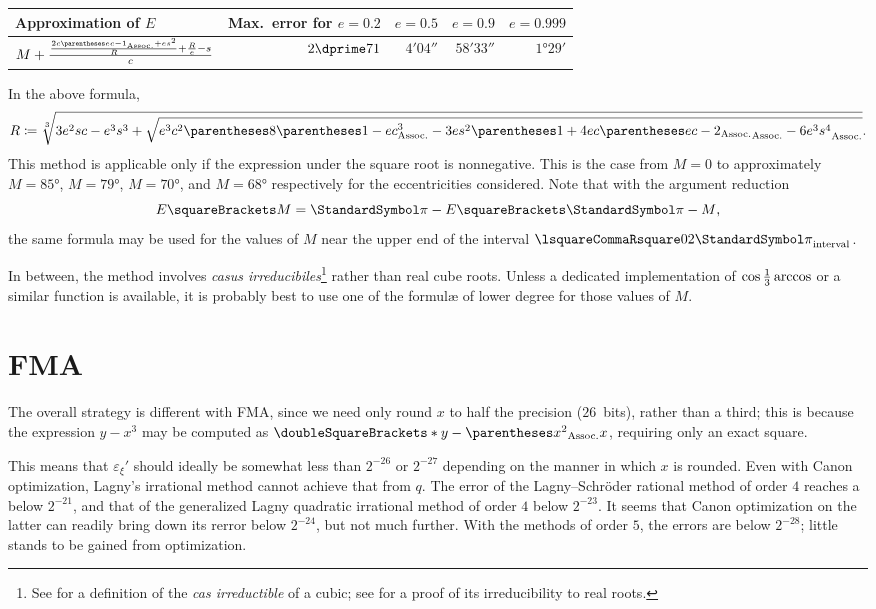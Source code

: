 ﻿\documentclass[10pt, a4paper, twoside]{basestyle}
\newcommand{\round}[1]{\doubleSquareBrackets*{#1}}
\begin{document}
\begin{center}
\begin{tabular}{lrrrr}
Approximation of $E$ & Max.~error for $e=0.2$ & $e=0.5$ & $e=0.9$ & $e=0.999$ \\
\hline
$M+\frac{\frac{2c\pa{ec-1}+es^2}{R}+\frac{R}{e}-s}{c}$
 & $2\rlap.\dprime71$ & $4'04\dprime$ & $58'33\dprime$& $1°29'$
\end{tabular}
\end{center}
In the above formula,\[
R\DefineAs\sqrt[3]{3e^2sc-e^3s^3+\sqrt{e^3c^2\pa{8\pa{1-ec}^3-3es^2\pa{1+4ec\pa{ec-2}}-6e^3s^4}}}\text.
\]
This method is applicable only if the expression under the square root is nonnegative.
This is the case from $M=0$ to approximately $M=85°$, $M=79°$, $M=70°$, and $M=68°$
respectively for the eccentricities considered. Note that with the argument reduction\[
E\of{M}=\Pi-E\of{\Pi-M}\text,\]
the same formula may be used for the values of $M$ near the upper end of the interval $\intclos{0}{2\Pi}$.

In between, the method involves 
\emph{casus irreducibiles}\footnote{See \cite[469]{FantetdeLagny1697} for a definition
of the \emph{cas irreductible} of a cubic; see \cite[125\psqq]{Wantzel1843} for a proof of its irreducibility to real
roots.} rather than real cube roots.
Unless a dedicated implementation of $\cos\smash{\frac{1}{3}}\arccos$ or a similar function is available,
it is probably best to use one of the formulæ of lower degree for those values of $M$.

\section{FMA}
\label{FMA}
The overall strategy is different with FMA, since we need only round $x$ to half the precision ($26$~bits),
rather than a third; this is because the expression $y-x^3$ may be computed as $\round{y-\pa{x^2}x}$,
requiring only an exact square.

This means that $ε_ξ'$ should ideally be somewhat less than $2^{-26}$ or $2^{-27}$ depending on
the manner in which $x$ is rounded. Even with Canon optimization, Lagny's irrational method cannot
achieve that from $q$. The error of the Lagny--Schröder rational method of order $4$ reaches a below $2^{-21}$,
and that of the generalized Lagny quadratic irrational method of order $4$ below $2^{-23}$.
It seems that Canon optimization on the latter can readily bring down its rerror below $2^{-24}$, but not much
further.
With the methods of order $5$, the errors are below $2^{-28}$; little stands to be gained from optimization.
\end{document}
